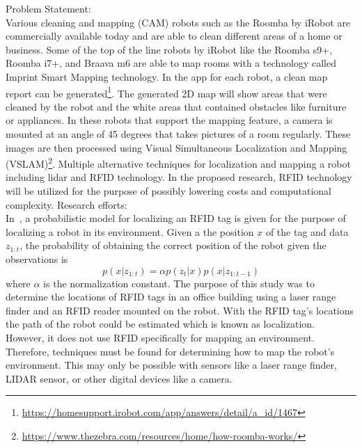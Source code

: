 \documentclass[fontsize=11pt, %
                             paper=a4, %
                             twoside, %
                             captions=tableheading,
                             index=totoc,
                             hyperref]{labbook}
\begin{document}
\begin{addmargin}[0cm]{0cm} %

\pagestyle{scrheadings} %


Problem Statement:\\
Various cleaning and mapping (CAM) robots such as the Roomba by iRobot are commercially available today and are able to clean different areas of a home or business. Some of the top of the line robots by iRobot like the Roomba s9+, Roomba i7+, and Braava m6 are able to map rooms with a technology called Imprint Smart Mapping technology. In the app for each robot, a clean map report can be generated\footnote{\url{https://homesupport.irobot.com/app/answers/detail/a_id/1467}}. The generated 2D map will show areas that were cleaned by the robot and the white areas that contained obstacles like furniture or appliances. In these robots that support the mapping feature, a camera is mounted at an angle of 45 degrees that takes pictures of a room regularly. These images are then processed using Visual Simultaneous Localization and Mapping (VSLAM)\footnote{\url{https://www.thezebra.com/resources/home/how-roomba-works/}}. Multiple alternative techniques for localization and mapping a robot including lidar and RFID technology. In the proposed research, RFID technology will be utilized for the purpose of possibly lowering costs and computational complexity.
\smallbreak\noindent
Research efforts:\\
In~\cite{hahnel2004}, a probabilistic model for localizing an RFID tag is given for the purpose of localizing a robot in its environment. Given a the position $x$ of the tag and data $z_{1:t}$, the probability of obtaining the correct position of the robot given the observations is 
\[
p(x|z_{1:t})=\alpha p(z_t \vert x) p(x \vert z_{1:t-1})
\]
where $\alpha$ is the normalization constant. The purpose of this study was to determine the locations of RFID tags in an office building using a laser range finder and an RFID reader mounted on the robot. With the RFID tag's locations the path of the robot could be estimated which is known as localization. However, it does not use RFID specifically for mapping an environment. Therefore, techniques must be found for determining how to map the robot's environment. This may only be possible with sensors like a laser range finder, LIDAR sensor, or other digital devices like a camera.


\end{addmargin}
\end{document}
